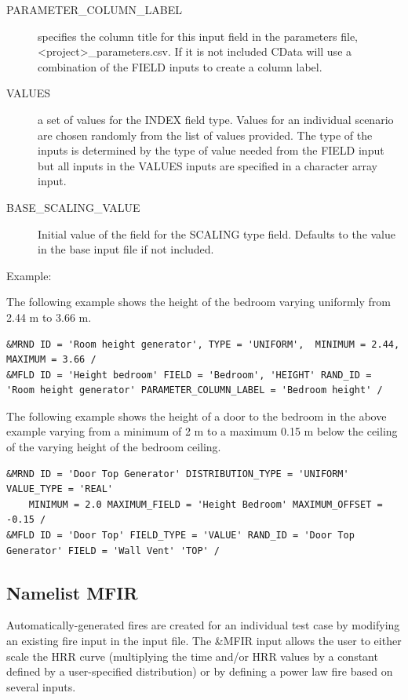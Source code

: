 \documentclass[12pt,twoside]{book}
\begin{document}
\begin{description}
  \item[PARAMETER\_COLUMN\_LABEL] specifies the column title for this input field in the parameters file, {\ct <project>\_parameters.csv}. If it is not included CData will use a combination of the {\ct FIELD} inputs to create a column label.
  \item[VALUES] a set of values for the {\ct INDEX} field type. Values for an individual scenario are chosen randomly from the list of values provided. The type of the inputs is determined by the type of value needed from the {\ct FIELD} input but all inputs in the {\ct VALUES} inputs are specified in a character array input.
  \item[BASE\_SCALING\_VALUE] Initial value of the field for the {\ct SCALING} type field. Defaults to the value in the base input file if not included.
\end{description}

\vspace{\baselineskip}
\noindent Example:

The following example shows the height of the bedroom varying uniformly from 2.44 m to 3.66 m.
\begin{lstlisting}
&MRND ID = 'Room height generator', TYPE = 'UNIFORM',  MINIMUM = 2.44, MAXIMUM = 3.66 /
&MFLD ID = 'Height bedroom' FIELD = 'Bedroom', 'HEIGHT' RAND_ID = 'Room height generator' PARAMETER_COLUMN_LABEL = 'Bedroom height' /
\end{lstlisting}

The following example shows the height of a door to the bedroom in the above example varying from a minimum of 2 m to a maximum 0.15 m below the ceiling of the varying height of the bedroom ceiling.

\begin{lstlisting}
&MRND ID = 'Door Top Generator' DISTRIBUTION_TYPE = 'UNIFORM' VALUE_TYPE = 'REAL'
    MINIMUM = 2.0 MAXIMUM_FIELD = 'Height Bedroom' MAXIMUM_OFFSET = -0.15 /
&MFLD ID = 'Door Top' FIELD_TYPE = 'VALUE' RAND_ID = 'Door Top Generator' FIELD = 'Wall Vent' 'TOP' /
\end{lstlisting}


\clearpage

\subsection{Namelist MFIR}

Automatically-generated fires are created for an individual test case by modifying an existing fire input in the input file. The {\ct \&MFIR} input allows the user to either scale the HRR curve (multiplying the time and/or HRR values by a constant defined by a user-specified distribution) or by defining a power law fire based on several inputs.
\end{document}

